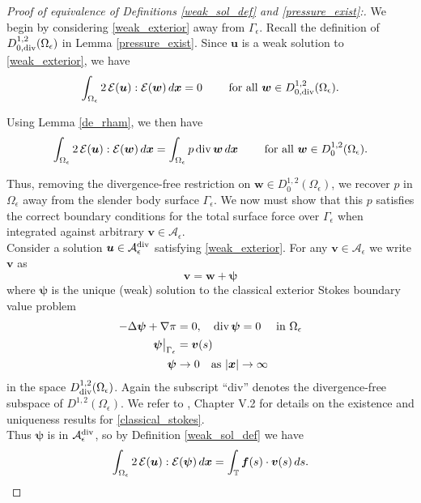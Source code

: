 \documentclass[11pt]{article}
\numberwithin{equation}{section}
\newcommand{\T}{\mathbb{T}}
\newcommand{\A}{\mathcal{A}}
\newcommand{\E}{\mathcal{E}}
\newcommand{\bu}{\bm{u}}
\newcommand{\bw}{\bm{w}}
\newcommand{\bx}{\bm{x}}
\newcommand{\bv}{\bm{v}}
\newcommand{\ts}{\thinspace}
\newcommand{\dive}{{\rm{div}}}
\theoremstyle{definition}
\begin{document}
 
 \begin{proof}[Proof of equivalence of Definitions \ref{weak_sol_def} and \ref{pressure_exist}:]
We begin by considering \eqref{weak_exterior} away from $\Gamma_{\epsilon}$. Recall the definition of $D^{1,2}_{0,\dive}(\Omega_{\epsilon})$ in Lemma \ref{pressure_exist}. Since $\bu$ is a weak solution to \eqref{weak_exterior}, we have
\[ \int_{\Omega_{\epsilon}} 2\ts\E(\bu):\E(\bw) \ts d\bx = 0 \qquad \text{ for all } \bw \in D^{1,2}_{0,\dive}(\Omega_\epsilon). \]

Using Lemma \ref{de_rham}, we then have
\begin{equation}\label{pressure_eqn}
\int_{\Omega_{\epsilon}} 2\ts\E(\bu):\E(\bw) \ts d\bx = \int_{\Omega_{\epsilon}} p \ts\dive\ts \bw \ts d\bx \qquad \text{ for all } \bw \in D_0^{1,2}(\Omega_{\epsilon}).
\end{equation}

Thus, removing the divergence-free restriction on $\bw\in D_0^{1,2}(\Omega_{\epsilon})$, we recover $p$ in $\Omega_{\epsilon}$ away from the slender body surface $\Gamma_{\epsilon}$. We now must show that this $p$ satisfies the correct boundary conditions for the total surface force over $\Gamma_{\epsilon}$ when integrated against arbitrary $\bv \in \A_{\epsilon}$. \\

Consider a solution $\bu \in \A_{\epsilon}^{\dive}$ satisfying \eqref{weak_exterior}. For any $\bv\in \A_{\epsilon}$ we write $\bv$ as 
\[ \bv = \bw+{\bm \psi} \]
where ${\bm \psi}$ is the unique (weak) solution to the classical exterior Stokes boundary value problem
\begin{equation}\label{classical_stokes}
\begin{aligned}
-\Delta {\bm \psi} + \nabla \pi &= 0, \quad \dive \ts {\bm \psi} = 0 \quad \text{ in }\Omega_\epsilon \\
{\bm \psi} \big|_{\Gamma_{\epsilon}} &= \bv(s) \\
{\bm \psi} &\to 0 \quad \text{as }|\bx| \to \infty
\end{aligned}
\end{equation}
in the space $D^{1,2}_{\dive}(\Omega_{\epsilon})$. Again the subscript ``div'' denotes the divergence-free subspace of $D^{1,2}(\Omega_{\epsilon})$. We refer to \cite{galdi2011introduction}, Chapter V.2 for details on the existence and uniqueness results for \eqref{classical_stokes}. \\

Thus ${\bm \psi}$ is in $\A_\epsilon^{\dive}$, so by Definition \ref{weak_sol_def} we have
\begin{equation}\label{div_free_part}
\int_{\Omega_{\epsilon}} 2 \ts \E(\bu):\E({\bm \psi}) \ts d\bx = \int_{\T} {\bm f}(s)\cdot\bv(s) \ts ds.
\end{equation}


\end{proof}
\end{document}
